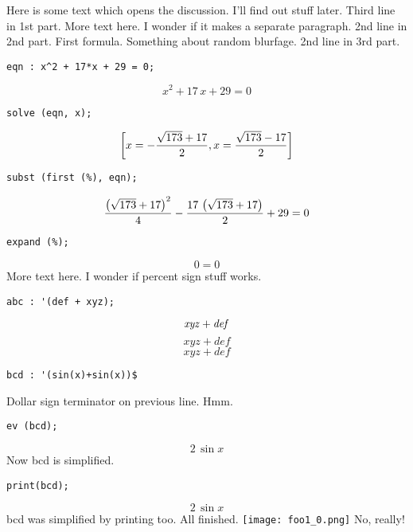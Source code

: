 \documentclass[12pt]{article}
\begin{document}
Here is some text which opens the discussion.
I'll find out stuff later.
Third line in 1st part.
More text here. I wonder if it makes a separate paragraph.
2nd line in 2nd part.
First formula. Something about random blurfage.
2nd line in 3rd part.
\begin{verbatim}
eqn : x^2 + 17*x + 29 = 0;
\end{verbatim}
$$x^2+17\,x+29=0$$
\begin{verbatim}
solve (eqn, x);
\end{verbatim}
$$\left[ x=-{{\sqrt{173}+17}\over{2}} , x={{\sqrt{173}-17}\over{2}}
  \right] $$
\begin{verbatim}
subst (first (%), eqn);
\end{verbatim}
$${{\left(\sqrt{173}+17\right)^2}\over{4}}-{{17\,\left(\sqrt{173}+17
 \right)}\over{2}}+29=0$$
\begin{verbatim}
expand (%);
\end{verbatim}
$$0=0$$
More text here. I wonder if percent sign stuff works.
\begin{verbatim}
abc : '(def + xyz);
\end{verbatim}
$${\it xyz}+{\it def}$$
$${\mathit xyz}+{\mathit def}$$
$$xyz + def$$
\begin{verbatim}
bcd : '(sin(x)+sin(x))$
\end{verbatim}
Dollar sign terminator on previous line. Hmm.
\begin{verbatim}
ev (bcd);
\end{verbatim}
$$2\,\sin x$$
Now bcd is simplified.
\begin{verbatim}
print(bcd);
\end{verbatim}
$$2\,\sin x$$
bcd was simplified by printing too.
All finished.
\texttt{[image: foo1\_0.png]}
No, really!
\end{document}
